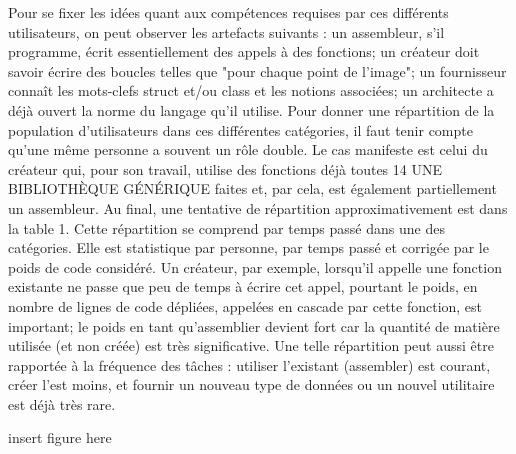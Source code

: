 Pour se fixer les idées quant aux compétences requises par ces différents utilisateurs, on peut
observer les artefacts suivants : un assembleur, s'il programme, écrit essentiellement des appels à
des fonctions; un créateur doit savoir écrire des boucles telles que "pour chaque point de l'image";
un fournisseur connaît les mots-clefs struct et/ou class et les notions associées; un architecte a déjà
ouvert la norme du langage qu'il utilise. Pour donner une répartition de la population d'utilisateurs
dans ces différentes catégories, il faut tenir compte qu'une même personne a souvent un rôle
double. Le cas manifeste est celui du créateur qui, pour son travail, utilise des fonctions déjà toutes
14 UNE BIBLIOTHÈQUE GÉNÉRIQUE
faites et, par cela, est également partiellement un assembleur. Au final, une tentative de répartition
approximativement est dans la table 1.
Cette répartition se comprend par temps passé dans une des catégories. Elle est statistique par
personne, par temps passé et corrigée par le poids de code considéré. Un créateur, par exemple,
lorsqu'il appelle une fonction existante ne passe que peu de temps à écrire cet appel, pourtant le
poids, en nombre de lignes de code dépliées, appelées en cascade par cette fonction, est important;
le poids en tant qu'assemblier devient fort car la quantité de matière utilisée (et non créée) est très
significative.
Une telle répartition peut aussi être rapportée à la fréquence des tâches : utiliser l'existant
(assembler) est courant, créer l'est moins, et fournir un nouveau type de données ou un nouvel
utilitaire est déjà très rare.

insert figure here

